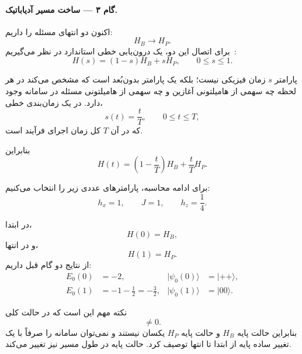 \paragraph{گام ۳ --- ساخت مسیر آدیاباتیک.}

اکنون دو انتهای مسئله را داریم:
\begin{equation}
	H_B
	\longrightarrow
	H_P.
\end{equation}
برای اتصال این دو، یک درون‌یابی خطی استاندارد در نظر می‌گیریم~\cite{Farhi2000}:
\begin{equation}
	\label{eq:adiabatic-interpolation-example}
	H(s)
	=
	(1-s)H_B+sH_P,
	\qquad
	0\leq s\leq1.
\end{equation}

پارامتر $s$ زمان فیزیکی نیست؛ بلکه یک پارامتر بدون‌بُعد است که مشخص می‌کند در هر لحظه چه سهمی از هامیلتونی آغازین و چه سهمی از هامیلتونی مسئله در سامانه وجود دارد. در یک زمان‌بندی خطی،
\begin{equation}
	s(t)=\frac{t}{T},
	\qquad
	0\leq t\leq T,
\end{equation}
که در آن $T$ کل زمان اجرای فرآیند است.

بنابراین
\begin{equation}
	H(t)
	=
	\left(1-\frac{t}{T}\right)H_B
	+
	\frac{t}{T}H_P.
\end{equation}

برای ادامه محاسبه، پارامترهای عددی زیر را انتخاب می‌کنیم:
\begin{equation}
	\label{eq:ising-example-parameters}
	h_x=1,
	\qquad
	J=1,
	\qquad
	h_z=\frac14.
\end{equation}

در ابتدا،
\begin{equation}
	H(0)=H_B,
\end{equation}
و در انتها،
\begin{equation}
	H(1)=H_P.
\end{equation}
از نتایج دو گام قبل داریم:
\begin{equation}
	\begin{aligned}
		E_0(0)&=-2,
		&
		\lvert\psi_0(0)\rangle&=\lvert++\rangle,
		\\
		E_0(1)&=-1-\frac12=-\frac32,
		&
		\lvert\psi_0(1)\rangle&=\lvert00\rangle.
	\end{aligned}
\end{equation}

نکته مهم این است که در حالت کلی
\begin{equation}
	[H_B,H_P]\neq0.
\end{equation}
بنابراین حالت پایه $H_B$ و حالت پایه $H_P$ یکسان نیستند و نمی‌توان سامانه را صرفاً با یک تغییر ساده پایه از ابتدا تا انتها توصیف کرد. حالت پایه در طول مسیر نیز تغییر می‌کند.


